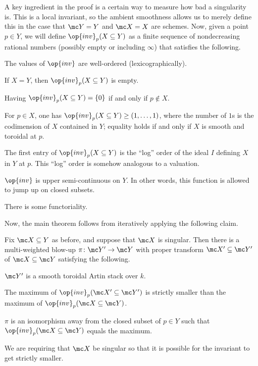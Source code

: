 \documentclass{article}
\begin{document}
A key ingredient in the proof is a certain way to measure how bad a singularity is. This is a local invariant, so the ambient smoothness allows us to merely define this in the case that $\mc Y=Y$ and $\mc X=X$ are schemes. Now, given a point $p\in Y$, we will define $\op{inv}_p(X\subseteq Y)$ as a finite sequence of nondecreasing rational numbers (possibly empty or including $\infty$) that satisfies the following.
\begin{listalph}
    \item The values of $\op{inv}$ are well-ordered (lexicographically).
    \item If $X=Y$, then $\op{inv}_p(X\subseteq Y)$ is empty.
    \item Having $\op{inv}_p(X\subseteq Y)=\{0\}$ if and only if $p\notin X$.
    \item For $p\in X$, one has $\op{inv}_p(X\subseteq Y)\ge(1,\ldots,1)$, where the number of $1$s is the codimension of $X$ contained in $Y$; equality holds if and only if $X$ is smooth and toroidal at $p$.
    \item The first entry of $\op{inv}_p(X\subseteq Y)$ is the ``log'' order of the ideal $I$ defining $X$ in $Y$ at $p$. This ``log'' order is somehow analogous to a valuation.
    \item $\op{inv}$ is upper semi-continuous on $Y$. In other words, this function is allowed to jump up on closed subsets.
    \item There is some functoriality.
\end{listalph}
Now, the main theorem follows from iteratively applying the following claim.
\begin{theorem}
    Fix $\mc X\subseteq Y$ as before, and suppose that $\mc X$ is singular. Then there is a multi-weighted blow-up $\pi\colon\mc Y'\to\mc Y$ with proper transform $\mc X'\subseteq\mc Y'$ of $\mc X\subseteq\mc Y$ satisfying the following.
    \begin{listalph}
        \item $\mc Y'$ is a smooth toroidal Artin stack over $k$.
        \item The maximum of $\op{inv}_p(\mc X'\subseteq\mc Y')$ is strictly smaller than the maximum of $\op{inv}_p(\mc X\subseteq\mc Y)$.
        \item $\pi$ is an isomorphism away from the closed subset of $p\in Y$ such that $\op{inv}_p(\mc X\subseteq\mc Y)$ equals the maximum.
    \end{listalph}
\end{theorem}
\begin{remark}
    We are requiring that $\mc X$ be singular so that it is possible for the invariant to get strictly smaller.
\end{remark}
\end{document}
